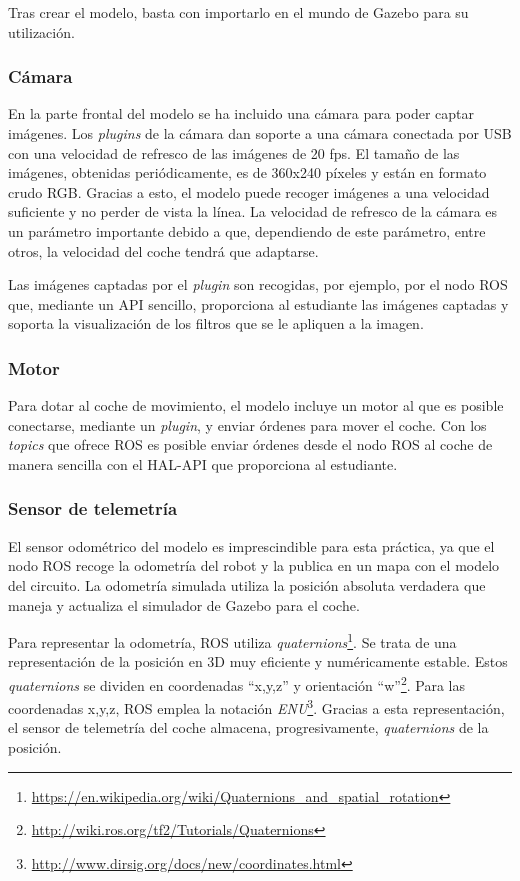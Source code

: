 Tras crear el modelo, basta con importarlo en el mundo de Gazebo para su utilización.

\subsubsection{Cámara}
En la parte frontal del modelo se ha incluido una cámara para poder captar imágenes.
Los \textit{plugins} de la cámara dan soporte a una cámara conectada por USB con una velocidad de refresco de las imágenes de 20 fps. El tamaño de las imágenes, obtenidas periódicamente, es de 360x240 píxeles y están en formato crudo RGB. Gracias a esto, el modelo puede recoger imágenes a una velocidad suficiente y no perder de vista la línea. La velocidad de refresco de la cámara es un parámetro importante debido a que, dependiendo de este parámetro, entre otros, la velocidad del coche tendrá que adaptarse.

Las imágenes captadas por el \textit{plugin} son recogidas, por ejemplo, por el nodo ROS que, mediante un API sencillo, proporciona al estudiante las imágenes captadas y soporta la visualización de los filtros que se le apliquen a la imagen.

\subsubsection{Motor}
Para dotar al coche de movimiento, el modelo incluye un motor al que es posible conectarse, mediante un \textit{plugin}, y enviar órdenes para mover el coche. 
Con los \textit{topics} que ofrece ROS es posible enviar órdenes desde el nodo ROS al coche de manera sencilla con el HAL-API que proporciona al estudiante.

\subsubsection{Sensor de telemetría}
El sensor odométrico del modelo es imprescindible para esta práctica, ya que el nodo ROS recoge la odometría del robot y la publica en un mapa con el modelo del circuito. La odometría simulada utiliza la posición absoluta verdadera que maneja y actualiza el simulador de Gazebo para el coche.

Para representar la odometría, ROS utiliza \textit{quaternions}\footnote{\url{https://en.wikipedia.org/wiki/Quaternions_and_spatial_rotation}}. Se trata de una representación de la posición en 3D muy eficiente y numéricamente estable. Estos \textit{quaternions} se dividen en coordenadas ``x,y,z'' y orientación ``w''\footnote{\url{http://wiki.ros.org/tf2/Tutorials/Quaternions}}. Para las coordenadas x,y,z, ROS emplea la notación \textit{ENU}\footnote{\url{http://www.dirsig.org/docs/new/coordinates.html}}. Gracias a esta representación, el sensor de telemetría del coche almacena, progresivamente, \textit{quaternions} de la posición. 

